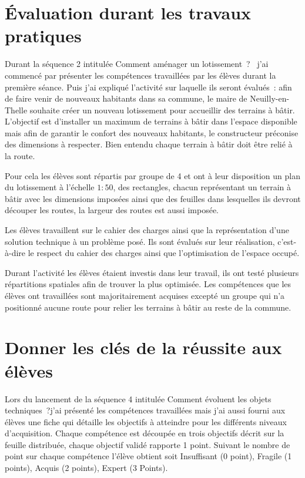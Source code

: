 
\section{Évaluation durant les travaux pratiques}

Durant la séquence 2 intitulée \og Comment aménager un lotissement~? \fg \ j'ai commencé par présenter les compétences travaillées par les élèves durant la première séance.
Puis j'ai expliqué l'activité sur laquelle ils seront évalués~: afin de faire venir de nouveaux habitants dans sa commune, le maire de Neuilly-en-Thelle souhaite créer un nouveau lotissement pour accueillir des terrains à bâtir.
L'objectif est d'installer un maximum de terrains à bâtir dans l'espace disponible mais afin de garantir le confort des nouveaux habitants, le constructeur préconise des dimensions à respecter.
Bien entendu chaque terrain à bâtir doit être relié à la route.

Pour cela les élèves sont répartis par groupe de 4 et ont à leur disposition un plan du lotissement à l'échelle $1:50$, des rectangles, chacun représentant un terrain à bâtir avec les dimensions imposées ainsi que des feuilles dans lesquelles ils devront découper les routes, la largeur des routes est aussi imposée.

Les élèves travaillent sur le cahier des charges ainsi que la représentation d'une solution technique à un problème posé.
Ils sont évalués sur leur réalisation, c'est-à-dire le respect du cahier des charges ainsi que l'optimisation de l'espace occupé.

Durant l'activité les élèves étaient investis dans leur travail, ils ont testé plusieurs répartitions spatiales afin de trouver la plus optimisée.
Les compétences que les élèves ont travaillées sont majoritairement acquises excepté un groupe qui n'a positionné aucune route pour relier les terrains à bâtir au reste de la commune.


\newpage
\section{Donner les clés de la réussite aux élèves}

Lors du lancement de la séquence 4 intitulée \og Comment évoluent les objets techniques~?\fg j'ai présenté les compétences travaillées mais j'ai aussi fourni aux élèves une fiche qui détaille les objectifs à atteindre pour les différents niveaux d'acquisition. 
Chaque compétence est découpée en trois objectifs décrit sur la feuille distribuée, chaque objectif validé rapporte 1 point. Suivant le nombre de point sur chaque compétence l'élève obtient soit Insuffisant (0 point), Fragile (1 points), Acquis (2 points), Expert (3 Points).

